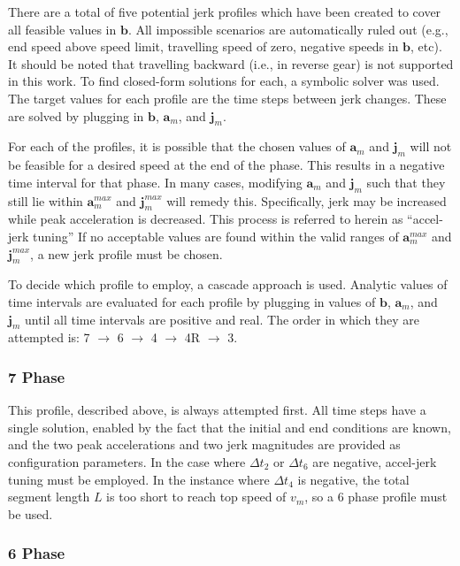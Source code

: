 \documentclass[letterpaper, 10 pt, conference]{ieeeconf}  %
\begin{document}
There are a total of five potential jerk profiles which have been created to cover all feasible values in $\mathbf{b}$.
All impossible scenarios are automatically ruled out (e.g., end speed above speed limit, travelling speed of zero, negative speeds in $\mathbf{b}$, etc).
It should be noted that travelling backward (i.e., in reverse gear) is not supported in this work.
To find closed-form solutions for each, a symbolic solver was used.
The target values for each profile are the time steps between jerk changes.
These are solved by plugging in $\mathbf{b}$, $\mathbf{a}_m$, and $\mathbf{j}_m$.

For each of the profiles, it is possible that the chosen values of $\mathbf{a}_m$ and $\mathbf{j}_m$ will not be feasible for a desired speed at the end of the phase.
This results in a negative time interval for that phase.
In many cases, modifying $\mathbf{a}_m$ and $\mathbf{j}_m$ such that they still lie within $\mathbf{a}^{max}_m$ and $\mathbf{j}^{max}_m$ will remedy this.
Specifically, jerk may be increased while peak acceleration is decreased.
This process is referred to herein as ``accel-jerk tuning''
If no acceptable values are found within the valid ranges of $\mathbf{a}^{max}_m$ and $\mathbf{j}^{max}_m$, a new jerk profile must be chosen.

To decide which profile to employ, a cascade approach is used.
Analytic values of time intervals are evaluated for each profile by plugging in values of $\mathbf{b}$, $\mathbf{a}_m$, and $\mathbf{j}_m$ until all time intervals are positive and real.
The order in which they are attempted is: 7 $\rightarrow$ 6 $\rightarrow$ 4 $\rightarrow$ 4R $\rightarrow$ 3.

\subsubsection{7 Phase} \label{sec:7phase}

This profile, described above, is always attempted first.
All time steps have a single solution, enabled by the fact that the initial and end conditions are known, and the two peak accelerations and two jerk magnitudes are provided as configuration parameters.
In the case where $\Delta t_2$ or $\Delta t_6$ are negative, accel-jerk tuning must be employed.
In the instance where $\Delta t_4$ is negative, the total segment length $L$ is too short to reach top speed of $v_m$, so a 6 phase profile must be used.

\subsubsection{6 Phase} \label{sec:6phase}
\end{document}
